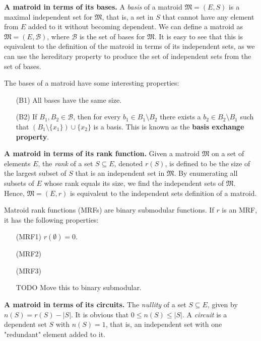 \textbf{A matroid in terms of its bases.} A \textit{basis} of a matroid $\mathfrak{M} = (E,S)$ is a maximal independent set for $\mathfrak{M}$, that is, a set in $S$ that cannot have any element from $E$ added to it without becoming dependent. We can define a matroid as $\mathfrak{M} = (E, \mathcal{B})$, where $\mathcal{B}$ is the set of bases for $\mathfrak{M}$. It is easy to see that this is equivalent to the definition of the matroid in terms of its independent sets, as we can use the hereditary property to produce the set of independent sets from the set of bases.

The bases of a matroid have some interesting properties:

\begin{enumerate}[align=left]
  \item [(B1)] All bases have the same size.
  \item [(B2)] If $B_1, B_2 \in \mathcal{B}$, then for every $b_1 \in B_1 \setminus B_2$ there exists a $b_2 \in B_2 \setminus B_1$ such that $(B_1 \setminus \{x_1\}) \cup \{x_2\}$ is a basis. This is known as the \textbf{basis exchange property}.
\end{enumerate}



\textbf{A matroid in terms of its rank function.} Given a matroid $\mathfrak{M}$ on a set of elements $E$, the \textit{rank} of a set $S \subseteq E$, denoted $r(S)$, is defined to be the size of the largest subset of $S$ that is an independent set in $\mathfrak{M}$. By enumerating all subsets of $E$ whose rank equals its size, we find the independent sets of $\mathfrak{M}$. Hence, $\mathfrak{M} = (E, r)$ is equivalent to the independent sets definition of a matroid.

Matroid rank functions (MRFs) are binary submodular functions. If $r$ is an MRF, it has the following properties:

\begin{enumerate}[align=left]
  \item [(MRF1)] $r(\emptyset) = 0$.
  \item [(MRF2)] \skelline
  \item [(MRF3)] \skelline
  \item [TODO] Move this to binary submodular.
\end{enumerate}



\textbf{A matroid in terms of its circuits.} The \textit{nullity} of a set $S \subseteq E$, given by $n(S) = r(S) - |S|$. It is obvious that $0 \leq n(S) \leq |S|$. A \textit{circuit} is a dependent set $S$ with $n(S) = 1$, that is, an independent set with one "redundant" element added to it. \skelpar




